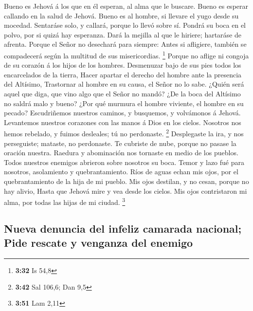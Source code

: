  Bueno es Jehová á los que en él esperan, al alma que le
buscare.  Bueno es esperar callando en la salud de Jehová.
 Bueno es al hombre, si llevare el yugo desde su mocedad.
 Sentaráse solo, y callará, porque lo llevó sobre sí.
 Pondrá su boca en el polvo, por si quizá hay esperanza.
 Dará la mejilla al que le hiriere; hartaráse de afrenta.
 Porque el Señor no desechará para siempre: 
Antes si afligiere, también se compadecerá según la multitud de sus
misericordias. \footnote{\textbf{3:32} Is 54,8}  Porque no
aflige ni congoja de su corazón á los hijos de los hombres.
 Desmenuzar bajo de sus pies todos los encarcelados de la
tierra,  Hacer apartar el derecho del hombre ante la
presencia del Altísimo,  Trastornar al hombre en su causa,
el Señor no lo sabe.  ¿Quién será aquel que diga, que vino
algo que el Señor no mandó?  ¿De la boca del Altísimo no
saldrá malo y bueno?  ¿Por qué murmura el hombre viviente,
el hombre en su pecado?  Escudriñemos nuestros caminos, y
busquemos, y volvámonos á Jehová.  Levantemos nuestros
corazones con las manos á Dios en los cielos.  Nosotros nos
hemos rebelado, y fuimos desleales; tú no perdonaste. \footnote{\textbf{3:42}
  Sal 106,6; Dan 9,5}  Desplegaste la ira, y nos
perseguiste; mataste, no perdonaste.  Te cubriste de nube,
porque no pasase la oración nuestra.  Raedura y abominación
nos tornaste en medio de los pueblos.  Todos nuestros
enemigos abrieron sobre nosotros su boca.  Temor y lazo fué
para nosotros, asolamiento y quebrantamiento.  Ríos de
aguas echan mis ojos, por el quebrantamiento de la hija de mi pueblo.
 Mis ojos destilan, y no cesan, porque no hay alivio,
 Hasta que Jehová mire y vea desde los cielos.
 Mis ojos contristaron mi alma, por todas las hijas de mi
ciudad. \footnote{\textbf{3:51} Lam 2,11}

\hypertarget{nueva-denuncia-del-infeliz-camarada-nacional-pide-rescate-y-venganza-del-enemigo}{%
\subsection{Nueva denuncia del infeliz camarada nacional; Pide rescate y
venganza del
enemigo}\label{nueva-denuncia-del-infeliz-camarada-nacional-pide-rescate-y-venganza-del-enemigo}}

